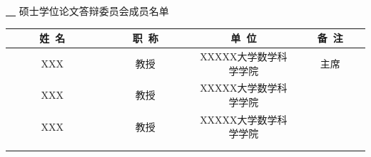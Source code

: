 \thispagestyle{empty}
\vspace*{2em}



%


\makeatletter
\begin{center}\STSong{}
 \underline{\ \@cauthor\ } 硕士学位论文答辩委员会成员名单
\end{center}
\makeatother

\begin{center}
\renewcommand{\arraystretch}{1.4}
  \begin{tabular}{|c|c|c|c|} \hline
   ~~~~~姓~名~~~~~ & ~~~~~职~称~~~~~
   & \hspace{6em}单~位\hspace{6em} & ~~~备~注~~~\\\hline
         XXX    &   教授    &  XXXXX大学数学科学学院  & 主席  \\ \hline
         XXX    &   教授    &  XXXXX大学数学科学学院  &       \\ \hline
         XXX    &   教授    &  XXXXX大学数学科学学院  &       \\ \hline
                &           &                   &       \\ \hline
                &           &                   &       \\ \hline
  \end{tabular}
\end{center}
